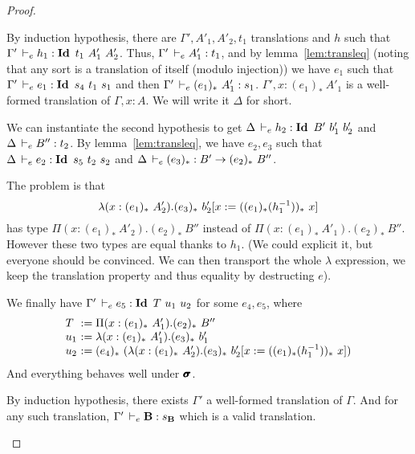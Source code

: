 \documentclass[a4paper,english]{lipics-utf8x}
\begin{document}
\begin{proof}
\begin{caselist}
      \nextcase
      \begin{mathc}
      \end{mathc}
      By induction hypothesis, there are $\Gamma',A'_1,A'_2,t_1$ translations
      and $h$ such that $\Gamma' \,\vdash_e h_1 : \operatorname{\mathbf{Id}~} t_1\ A'_1\ A'_2$.
      Thus, $\Gamma' \,\vdash_e A'_1 : t_1$, and by lemma~\ref{lem:transleq}
      (noting that any sort is a translation of itself (modulo injection))
      we have $e_1$ such that $\Gamma' \,\vdash_e e_1 : \operatorname{\mathbf{Id}~} s_4\ t_1\ s_1$ and
      then $\Gamma' \,\vdash_e (e_1)_*\ A'_1 : s_1$.
      $\Gamma', x : (e_1)_*\ A'_1$ is a well-formed translation of
      $\Gamma, x:A$. We will write it $\Delta$ for short.

      We can instantiate the second hypothesis to get
      $\Delta \,\vdash_e h_2 : \operatorname{\mathbf{Id}~} B'\ b'_1\ b'_2$ and $\Delta \,\vdash_e B'' : t_2$.
      By lemma~\ref{lem:transleq}, we have $e_2,e_3$ such that
      $\Delta \,\vdash_e e_2 : \operatorname{\mathbf{Id}~} s_5\ t_2\ s_2$ and
      $\Delta \,\vdash_e (e_3)_* : B' \to (e_2)_*\ B''$.

      The problem is that
      \[
        \lambda (x : (e_1)_*\ A'_2). (e_3)_*\ b'_2[x := ((e_1)_* (h_1^{-1}))_*\ x]
      \]
      has type
      $\Pi (x : (e_1)_*\ A'_2). (e_2)_*\ B''$ instead of
      $\Pi (x : (e_1)_*\ A'_1). (e_2)_*\ B''$.
      However these two types are equal thanks to $h_1$.
      (We could explicit it, but everyone should be convinced. We can then
      transport the whole $\lambda$ expression, we keep the translation
      property and thus equality by destructing $e$).

      We finally have
      $\Gamma' \,\vdash_e e_5 : \operatorname{\mathbf{Id}~} T\ u_1\ u_2$ for some $e_4,e_5$,
      where
      \[
        \begin{array}{l@{~}l}
          T   &:= \Pi (x : (e_1)_*\ A'_1). (e_2)_*\ B'' \\
          u_1 &:= \lambda (x : (e_1)_*\ A'_1). (e_3)_*\ b'_1 \\
          u_2 &:= (e_4)_*\ %
                   (\lambda (x : (e_1)_*\ A'_2).
                    (e_3)_*\ b'_2[x := ((e_1)_* (h_1\inv))_*\ x])
        \end{array}
      \]
      And everything behaves well under $\operatorname{\pmb{\bm{\sigma}}}$.

      \nextcase
      \begin{mathc}
        \ru{\derr \Gamma
          }{\Gamma \derr \mR : \sB}
      \end{mathc}
      By induction hypothesis, there exists $\Gamma'$ a well-formed translation
      of $\Gamma$. And for any such translation, $\Gamma' \,\vdash_e \operatorname{\mathbf{B}} : s_{\operatorname{\mathbf{B}}}$
      which is a valid translation.


\end{caselist}
\end{proof}
\end{document}
